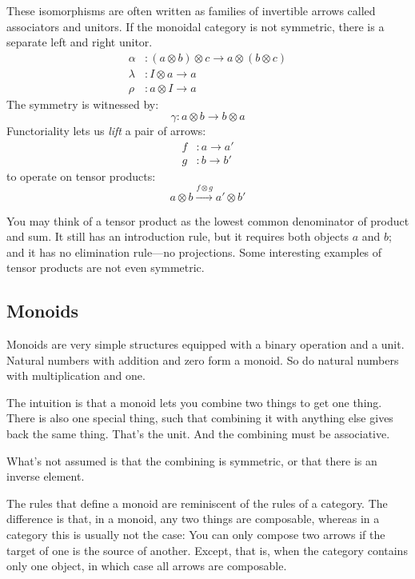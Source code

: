 \documentclass[DaoFP]{subfiles}
\begin{document}
These isomorphisms are often written as families of invertible arrows called associators and unitors. If the monoidal category is not symmetric, there is a separate left and right unitor.
\begin{align*}
\alpha &\colon (a \otimes b) \otimes c \to a \otimes (b \otimes c)
\\
 \lambda &\colon I \otimes a \to a
 \\
 \rho &\colon a \otimes I \to a
\end{align*}
The symmetry is witnessed by:
\[ \gamma \colon a \otimes b \to b \otimes a \]
Functoriality lets us \emph{lift} a pair of arrows:
\begin{align*} 
f &\colon a \to a' \\
g &\colon b \to b'
\end{align*}
 to operate on tensor products:
\[ a \otimes b \xrightarrow{f \otimes g} a' \otimes b' \]

You may think of a tensor product as the lowest common denominator of product and sum. It still has an introduction rule, but it requires both objects $a$ and $b$; and it has no elimination rule---no projections. Some interesting examples of tensor products are not even symmetric. 

\subsection{Monoids}

Monoids are very simple structures equipped with a binary operation and a unit. Natural numbers with addition and zero form a monoid. So do natural numbers with multiplication and one. 

The intuition is that a monoid lets you combine two things to get one thing. There is also one special thing, such that combining it with anything else gives back the same thing. That's the unit. And the combining must be associative. 

What's not assumed is that the combining is symmetric, or that there is an inverse element.

The rules that define a monoid are reminiscent of the rules of a category. The difference is that, in a monoid, any two things are composable, whereas in a category this is usually not the case: You can only compose two arrows if the target of one is the source of another. Except, that is, when the category contains only one object, in which case all arrows are composable.
\end{document}
